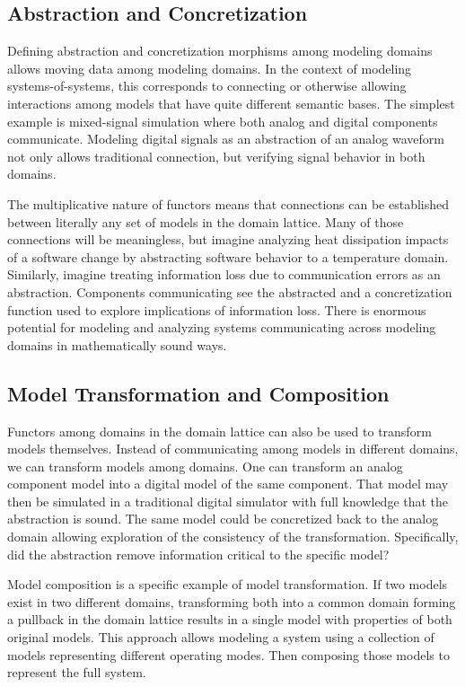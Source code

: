 \documentclass[12pt]{article}
\begin{document}
\subsection{Abstraction and Concretization}

Defining abstraction and concretization morphisms among modeling domains allows moving
data among modeling domains.  In the context of modeling systems-of-systems, this
corresponds to connecting or otherwise allowing interactions among models that have quite
different semantic bases.  The simplest example is mixed-signal simulation where both
analog and digital components communicate.  Modeling digital signals as an abstraction of
an analog waveform not only allows traditional connection, but verifying signal behavior
in both domains.

The multiplicative nature of functors means that connections can be established between
literally any set of models in the domain lattice.  Many of those connections will be
meaningless, but imagine analyzing heat dissipation impacts of a software change by
abstracting software behavior to a temperature domain.  Similarly, imagine treating
information loss due to communication errors as an abstraction.  Components communicating
see the abstracted and a concretization function used to explore implications of
information loss.  There is enormous potential for modeling and analyzing systems
communicating across modeling domains in mathematically sound ways.

\subsection{Model Transformation and Composition}

Functors among domains in the domain lattice can also be used to transform models
themselves.  Instead of communicating among models in different domains, we can transform
models among domains.  One can transform an analog component model into a digital model of
the same component.  That model may then be simulated in a traditional digital simulator
with full knowledge that the abstraction is sound.  The same model could be concretized
back to the analog domain allowing exploration of the consistency of the transformation.
Specifically, did the abstraction remove information critical to the specific model?

Model composition is a specific example of model transformation.  If two models exist in
two different domains, transforming both into a common domain forming a pullback in the
domain lattice results in a single model with properties of both original models.  This
approach allows modeling a system using a collection of models representing different
operating modes.  Then composing those models to represent the full system.
\end{document}
